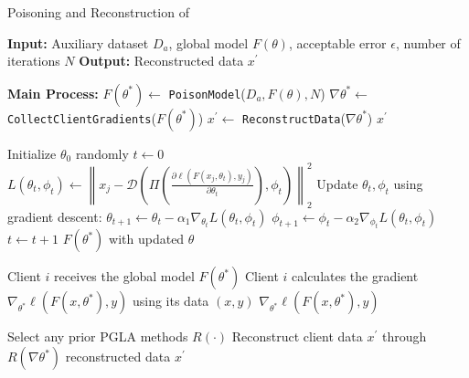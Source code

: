 \begin{algorithm}
\caption{Poisoning and Reconstruction of \name}
\label{algorithm1}
\begin{algorithmic}[1]
\State \textbf{Input:} Auxiliary dataset $D_a$, global model $F(\theta)$, acceptable error $\epsilon$, number of iterations $N$
\State \textbf{Output:} Reconstructed data $x^{\prime}$

\State \textbf{Main Process:}
\State $F(\theta^*) \gets$ \texttt{PoisonModel}($D_a, F(\theta), N$)
\State $\nabla \theta^* \gets$ \texttt{CollectClientGradients}($F(\theta^*)$)
\State $x^{\prime} \gets$ \texttt{ReconstructData}($\nabla \theta^*$)
\State \Return $x^{\prime}$

\State Initialize $\theta_{0}$ randomly
\State $t \gets 0$
        \State $L(\theta_{t}, \phi_{t}) \gets \left\|x_j - \mathcal{D}\left(\Pi\left(\frac{\partial \ell(F(x_j, \theta_{t}), y_j)}{\partial \theta_{t}}\right), \phi_{t}\right) \right\|_2^2$
        \State Update $\theta_{t}, \phi_{t}$ using gradient descent:
        \State \quad $\theta_{t+1} \gets \theta_{t} - \alpha_1 \nabla_{\theta_{t}} L(\theta_{t}, \phi_{t})$
        \State \quad $\phi_{t+1} \gets \phi_{t} - \alpha_2 \nabla_{\phi_{t}} L(\theta_{t}, \phi_{t})$
        \State $t \gets t + 1$
    \EndFor
\EndWhile
\State \Return $F(\theta^*)$ with updated $\theta$
\EndFunction

    \State Client $i$ receives the global model $F(\theta^*)$
    \State Client $i$ calculates the gradient $\nabla_{\theta^*} \ell(F(x, \theta^*), y)$ using its data $(x, y)$
    \State \Return $\nabla_{\theta^*} \ell(F(x,\theta^*), y)$
\EndFunction

    \State Select any prior PGLA methods $R(\cdot)$
    \State Reconstruct client data $x^{\prime}$ through $R(\nabla \theta^*)$
    \State \Return reconstructed data $x^{\prime}$
\EndFunction

\end{algorithmic}
\end{algorithm}

